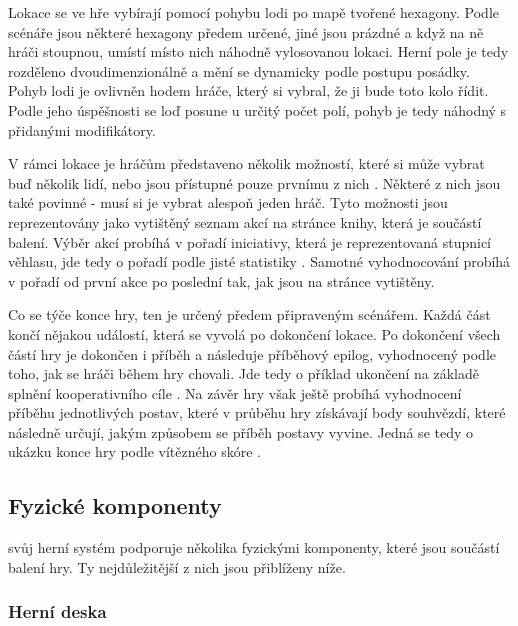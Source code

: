 Lokace se ve hře vybírají pomocí pohybu lodi po mapě tvořené hexagony. Podle scénáře jsou některé hexagony předem určené, jiné jsou prázdné a když na ně hráči stoupnou, umístí místo nich náhodně vylosovanou lokaci. Herní pole je tedy rozděleno dvoudimenzionálně a mění se dynamicky  podle postupu posádky. Pohyb lodi je ovlivněn hodem hráče, který si vybral, že ji bude toto kolo řídit. Podle jeho úspěšnosti se loď posune u určitý počet polí, pohyb je tedy náhodný  s přidanými modifikátory.

V rámci lokace je hráčům představeno několik možností, které si může vybrat buď několik lidí, nebo jsou přístupné pouze prvnímu z nich . Některé z nich jsou také povinné - musí si je vybrat alespoň jeden hráč. Tyto možnosti jsou reprezentovány jako vytištěný seznam akcí na stránce knihy, která je součástí balení. Výběr akcí probíhá v pořadí iniciativy, která je reprezentovaná stupnicí věhlasu, jde tedy o pořadí podle jisté statistiky . Samotné vyhodnocování probíhá v pořadí od první akce po poslední tak, jak jsou na stránce vytištěny.

Co se týče konce hry, ten je určený předem připraveným scénářem. Každá část končí nějakou událostí, která se vyvolá po dokončení lokace. Po dokončení všech částí hry je dokončen i příběh a následuje příběhový epilog, vyhodnocený podle toho, jak se hráči během hry chovali. Jde tedy o příklad ukončení na základě splnění kooperativního cíle . Na závěr hry však ještě probíhá vyhodnocení příběhu jednotlivých postav, které v průběhu hry získávají body souhvězdí, které následně určují, jakým způsobem se příběh postavy vyvine. Jedná se tedy o ukázku konce hry podle vítězného skóre .


\subsection{Fyzické komponenty}
\label{subsec:fw_components}

 svůj herní systém podporuje několika fyzickými komponenty, které jsou součástí balení hry. Ty nejdůležitější z nich jsou přiblíženy níže.

\subsubsection*{Herní deska}
\label{subsubsec:fw_comp_board_and_book}

